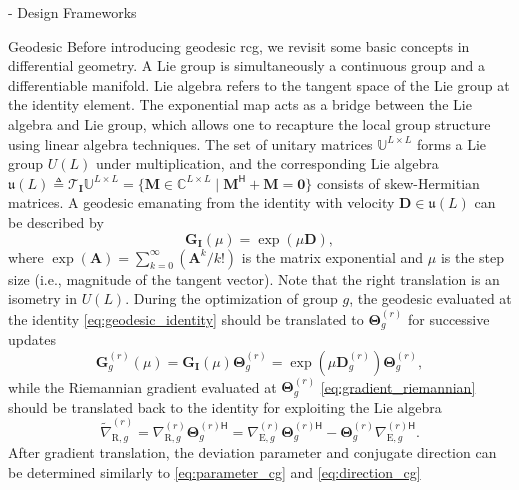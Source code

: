 \documentclass[journal]{IEEEtran}
\begin{document}
\begin{section}{- Design Frameworks}
	\begin{subsection}{Geodesic }
		Before introducing geodesic \gls{rcg}, we revisit some basic concepts in differential geometry.
		A Lie group is simultaneously a continuous group and a differentiable manifold.
		Lie algebra refers to the tangent space of the Lie group at the identity element.
		The exponential map acts as a bridge between the Lie algebra and Lie group, which allows one to recapture the local group structure using linear algebra techniques.
		The set of unitary matrices $\mathbb{U}^{L \times L}$ forms a Lie group $U(L)$ under multiplication, and the corresponding Lie algebra $\mathfrak{u}(L) \triangleq \mathcal{T}_{\mathbf{I}}\mathbb{U}^{L \times L} = \{\mathbf{M} \in \mathbb{C}^{L \times L} \mid \mathbf{M}^\mathsf{H} + \mathbf{M} = \mathbf{0}\}$ consists of skew-Hermitian matrices.
		A geodesic emanating from the identity with velocity $\mathbf{D} \in \mathfrak{u}(L)$ can be described by \cite{Edelman1998}
		\begin{equation}
			\mathbf{G}_\mathbf{I}(\mu) = \exp(\mu \mathbf{D}),
			\label{eq:geodesic_identity}
		\end{equation}
		where $\exp(\mathbf{A}) = \sum_{k=0}^\infty (\mathbf{A}^k/k!)$ is the matrix exponential and $\mu$ is the step size (i.e., magnitude of the tangent vector).
		Note that the right translation is an isometry in $U(L)$.
		During the optimization of group $g$, the geodesic evaluated at the identity \eqref{eq:geodesic_identity} should be translated to $\mathbf{\Theta}_g^{(r)}$ for successive updates \cite{Abrudan2008}
		\begin{equation}
			\mathbf{G}_g^{(r)}(\mu) = \mathbf{G}_\mathbf{I}(\mu) \mathbf{\Theta}_g^{(r)} = \exp(\mu \mathbf{D}_g^{(r)}) \mathbf{\Theta}_g^{(r)},
			\label{eq:geodesic_translated}
		\end{equation}
		while the Riemannian gradient evaluated at $\mathbf{\Theta}_g^{(r)}$ \eqref{eq:gradient_riemannian} should be translated back to the identity for exploiting the Lie algebra \cite{Abrudan2008}
		\begin{equation}
			\tilde{\nabla}_{\mathrm{R},g}^{(r)} = \nabla_{\mathrm{R},g}^{(r)} \mathbf{\Theta}_g^{(r)\mathsf{H}} = \nabla_{\mathrm{E},g}^{(r)} \mathbf{\Theta}_g^{(r)\mathsf{H}} - \mathbf{\Theta}_g^{(r)} {\nabla_{\mathrm{E},g}^{(r)\mathsf{H}}}.
			\label{eq:gradient_translated}
		\end{equation}
		After gradient translation, the deviation parameter and conjugate direction can be determined similarly to \eqref{eq:parameter_cg} and \eqref{eq:direction_cg}

\end{subsection}
\end{section}
\end{document}
